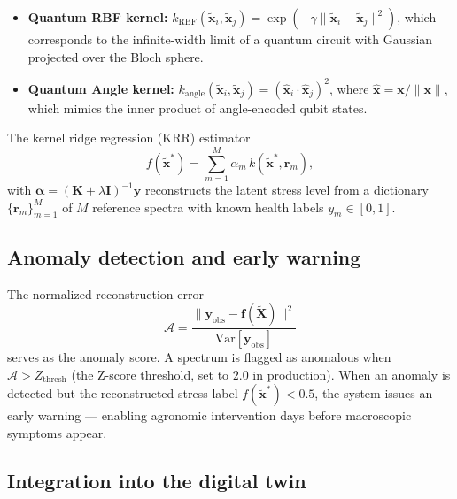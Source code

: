 \documentclass[11pt,a4paper]{article}
\begin{document}
\begin{itemize}
\item \textbf{Quantum RBF kernel:} $k_{\mathrm{RBF}}(\tilde{\mathbf{x}}_i, \tilde{\mathbf{x}}_j) = \exp(-\gamma \|\tilde{\mathbf{x}}_i - \tilde{\mathbf{x}}_j\|^2)$, which corresponds to the infinite-width limit of a quantum circuit with Gaussian projected over the Bloch sphere.
\item \textbf{Quantum Angle kernel:} $k_{\mathrm{angle}}(\tilde{\mathbf{x}}_i, \tilde{\mathbf{x}}_j) = (\hat{\mathbf{x}}_i \cdot \hat{\mathbf{x}}_j)^2$, where $\hat{\mathbf{x}} = \mathbf{x} / \|\mathbf{x}\|$, which mimics the inner product of angle-encoded qubit states.
\end{itemize}

The kernel ridge regression (KRR) estimator
\begin{equation}
f(\tilde{\mathbf{x}}^*) = \sum_{m=1}^{M} \alpha_m\, k(\tilde{\mathbf{x}}^*, \mathbf{r}_m),
\label{eq:SI_krr}
\end{equation}
with $\boldsymbol{\alpha} = (\mathbf{K} + \lambda \mathbf{I})^{-1} \mathbf{y}$ reconstructs the latent stress level from a dictionary $\{\mathbf{r}_m\}_{m=1}^M$ of $M$ reference spectra with known health labels $y_m \in [0, 1]$.

\subsection{Anomaly detection and early warning}

The normalized reconstruction error
\begin{equation}
\mathcal{A} = \frac{\|\mathbf{y}_{\mathrm{obs}} - \mathbf{f}(\tilde{\mathbf{X}})\|^2}{\mathrm{Var}[\mathbf{y}_{\mathrm{obs}}]}
\label{eq:SI_anomaly_score}
\end{equation}
serves as the anomaly score. A spectrum is flagged as anomalous when $\mathcal{A} > Z_{\mathrm{thresh}}$ (the Z-score threshold, set to $2.0$ in production). When an anomaly is detected but the reconstructed stress label $f(\tilde{\mathbf{x}}^*) < 0.5$, the system issues an early warning --- enabling agronomic intervention days before macroscopic symptoms appear.

\subsection{Integration into the digital twin}
\end{document}
